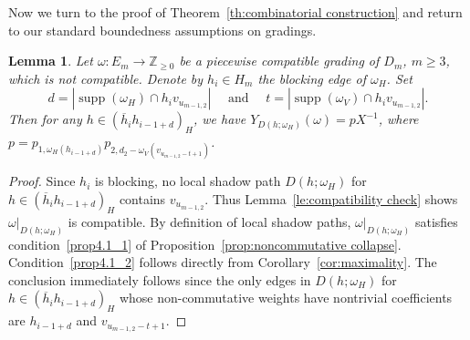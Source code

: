\documentclass[10pt]{amsart}
\newtheorem{lemma}[theorem]{Lemma}
\theoremstyle{definition}
\newcommand{\ZZ}{\mathbb{Z}}
\DeclareMathOperator{\supp}{supp}
\begin{document}
Now we turn to the proof of Theorem~\ref{th:combinatorial construction} and return to our standard boundedness assumptions on gradings.
\begin{lemma}
 \label{le:noncommutative collapse}
 Let $\omega:E_m\to\ZZ_{\ge0}$ be a piecewise compatible grading of $D_m$, $m\ge3$, which is not compatible.
 Denote by $h_i\in H_m$ the blocking edge of $\omega_H$. 
 Set 
 \[d=|\supp(\omega_H)\cap h_iv_{u_{m-1,2}}|\quad\text{ and }\quad t=|\supp(\omega_V)\cap h_iv_{u_{m-1,2}}|.\]
 Then for any $h\in(\overline{h}_ih_{i-1+d})_H$, we have $Y_{D(h;\omega_H)}(\omega)=pX^{-1}$, where $p=p_{1,\omega_H(h_{i-1+d})}p_{2,d_2-\omega_V(v_{u_{m-1,2}-t+1})}$.
\end{lemma}
\begin{proof}
 Since $h_i$ is blocking, no local shadow path $D(h;\omega_H)$ for $h\in(\overline{h}_ih_{i-1+d})_H$ contains $v_{u_{m-1,2}}$.
 Thus Lemma~\ref{le:compatibility check} shows $\omega|_{D(h;\omega_H)}$ is compatible.
 By definition of local shadow paths, $\omega|_{D(h;\omega_H)}$ satisfies condition~\ref{prop4.1_1} of Proposition~\ref{prop:noncommutative collapse}.
 Condition~\ref{prop4.1_2} follows directly from Corollary~\ref{cor:maximality}.
 The conclusion immediately follows since the only edges in $D(h;\omega_H)$ for $h\in(\overline{h}_ih_{i-1+d})_H$ whose non-commutative weights have nontrivial coefficients are $h_{i-1+d}$ and $v_{u_{m-1,2}-t+1}$.
\end{proof}
\end{document}
